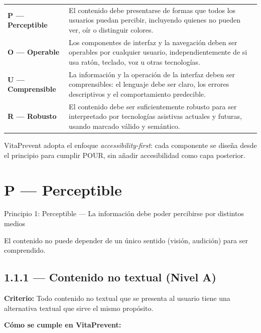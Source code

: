 \documentclass[12pt, a4paper]{article}
\begin{document}
\begin{center}
\begin{tabular}{@{}>{\bfseries\color{navydeep}}p{2.8cm} p{11cm}@{}}
\textbf{P} --- Perceptible & El contenido debe presentarse de formas que todos los usuarios puedan percibir, incluyendo quienes no pueden ver, oír o distinguir colores. \\[6pt]
\textbf{O} --- Operable & Los componentes de interfaz y la navegación deben ser operables por cualquier usuario, independientemente de si usa ratón, teclado, voz u otras tecnologías. \\[6pt]
\textbf{U} --- Comprensible & La información y la operación de la interfaz deben ser comprensibles: el lenguaje debe ser claro, los errores descriptivos y el comportamiento predecible. \\[6pt]
\textbf{R} --- Robusto & El contenido debe ser suficientemente robusto para ser interpretado por tecnologías asistivas actuales y futuras, usando marcado válido y semántico. \\
\end{tabular}
\end{center}

VitaPrevent adopta el enfoque \textit{accessibility-first}: cada componente se diseña desde el principio para cumplir POUR, sin añadir accesibilidad como capa posterior.

\section{P --- Perceptible}

\begin{princbox}[royalblue]{Principio 1: Perceptible --- La información debe poder percibirse por distintos medios}

El contenido no puede depender de un único sentido (visión, audición) para ser comprendido.
\end{princbox}

\subsection{1.1.1 --- Contenido no textual (Nivel A)}

\textbf{Criterio:} Todo contenido no textual que se presenta al usuario tiene una alternativa textual que sirve el mismo propósito.

\textbf{Cómo se cumple en VitaPrevent:}
\end{document}
